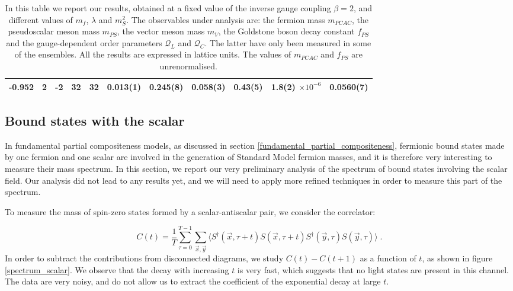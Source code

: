 \begin{table}
\begin{adjustwidth}{-4em}{-4em}
\begin{tabular}{l  l l l l l l l l l l}
-0.952 & 2 & -2 & 32 & 32  & 0.013(1) & 0.245(8) & 0.058(3) & 0.43(5) & 1.8(2) $\times 10^{-6}$ & 0.0560(7)\\
\bottomrule
\end{tabular}
\end{adjustwidth}
\caption{In this table we report our results, obtained at a fixed value of the inverse gauge coupling $\beta = 2$, and different values of $m_f$, $\lambda$ and $m_S^2$. The observables under analysis are: the fermion mass $m_{PCAC}$, the pseudoscalar meson mass $m_{PS}$, the vector meson mass $m_V$, the Goldstone boson decay constant $f_{PS}$ and the gauge-dependent order parameters $\mathcal Q_L$ and $\mathcal Q_C$. The latter have only been measured in some of the ensembles. All the results are expressed in lattice units. The values of $m_{PCAC}$ and $f_{PS}$ are unrenormalised.}
\label{data}
\end{table}



\subsection{Bound states with the scalar}

In fundamental partial compositeness models, as discussed in section \ref{fundamental_partial_compositeness}, fermionic bound states made by one fermion and one scalar are involved in the generation of Standard Model fermion masses, and it is therefore very interesting to measure their mass spectrum. In this section, we report our very preliminary analysis of the spectrum of bound states involving the scalar field. Our analysis did not lead to any results yet, and we will need to apply more refined techniques in order to measure this part of the spectrum.  

To measure the mass of spin-zero states formed by a scalar-antiscalar pair, we consider the correlator:

\begin{equation}
C(t) = \frac{1}{T} \sum_{\tau=0}^{T-1} \sum_{\vec x,\vec y} \langle S^{\dagger}(\vec x,\tau + t) S(\vec x, \tau + t) S^{\dagger}(\vec y,\tau) S(\vec y,\tau) \rangle \; .
\label{scalar_correlator}
\end{equation}
%
In order to subtract the contributions from disconnected diagrams, we study $C(t)-C(t+1)$ as a function of $t$, as shown  in figure \ref{spectrum_scalar}. We observe that the decay with increasing $t$ is very fast, which suggests that no light states are present in this channel. The data are very noisy, and do not allow us to extract the coefficient of the exponential decay at large $t$.

